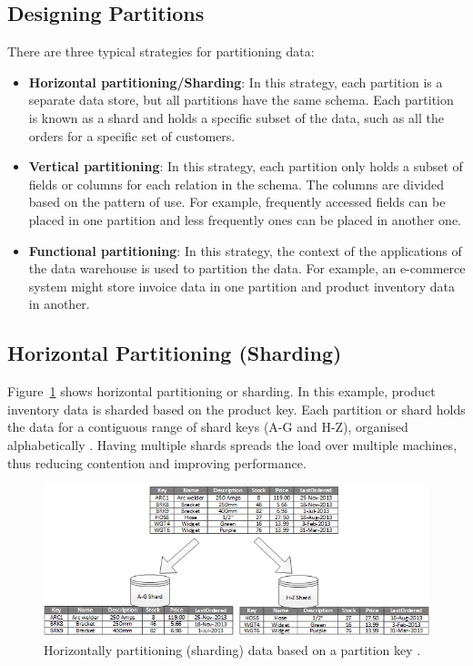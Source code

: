 \subsection{Designing Partitions}
There are three typical strategies for partitioning data:
\begin{itemize}
    \item \textbf{Horizontal partitioning/Sharding}: In this strategy, each partition is a separate data store, but all partitions have the same schema. Each partition is known as a shard and holds a specific subset of the data, such as all the orders for a specific set of customers.
    \item \textbf{Vertical partitioning}: In this strategy, each partition only holds a subset of fields or columns for each relation in the schema. The columns are divided based on the pattern of use. For example, frequently accessed fields can be placed in one partition and less frequently ones can be placed in another one.
    \item \textbf{Functional partitioning}: In this strategy, the context of the applications of the data warehouse is used to partition the data. For example, an e-commerce system might store invoice data in one partition and product inventory data in another.
    
\end{itemize}

\subsection{Horizontal Partitioning (Sharding)}
Figure~\ref{fig:horizontal-partitioning} shows horizontal partitioning or sharding. In this example, product inventory data is sharded based on the product key. Each partition or shard holds the data for a contiguous range of shard keys (A-G and H-Z), organised alphabetically \cite{Datapart51:online}. Having multiple shards spreads the load over multiple machines, thus reducing contention and improving performance.

\begin{figure}[h]
  \centering
  \includegraphics[width=\linewidth]{figures/horiziontal-partitoning.png}
  \caption{Horizontally partitioning (sharding) data based on a partition key \cite{Datapart51:online}.}
  \label{fig:horizontal-partitioning}

\end{figure}

